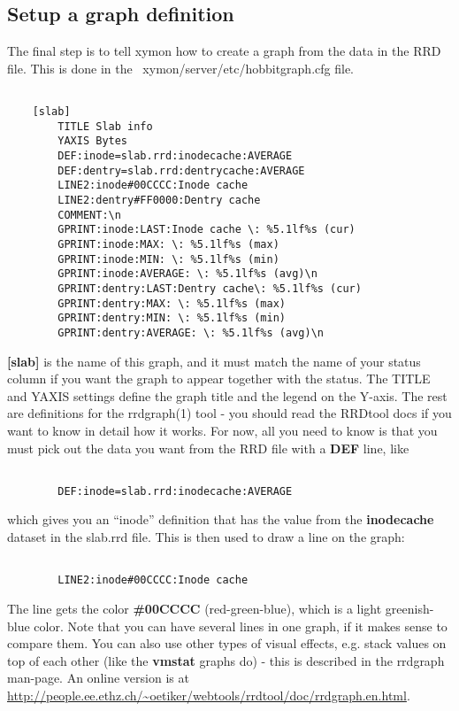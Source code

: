 \subsection{Setup a graph definition}


 The final step is to tell xymon how to create a graph from the data in the RRD file. This is done in the ~xymon/server/etc/hobbitgraph.cfg file. \begin{verbatim}

	[slab]
		TITLE Slab info
		YAXIS Bytes
		DEF:inode=slab.rrd:inodecache:AVERAGE
		DEF:dentry=slab.rrd:dentrycache:AVERAGE
		LINE2:inode#00CCCC:Inode cache
		LINE2:dentry#FF0000:Dentry cache
		COMMENT:\n
		GPRINT:inode:LAST:Inode cache \: %5.1lf%s (cur)
		GPRINT:inode:MAX: \: %5.1lf%s (max)
		GPRINT:inode:MIN: \: %5.1lf%s (min)
		GPRINT:inode:AVERAGE: \: %5.1lf%s (avg)\n
		GPRINT:dentry:LAST:Dentry cache\: %5.1lf%s (cur)
		GPRINT:dentry:MAX: \: %5.1lf%s (max)
		GPRINT:dentry:MIN: \: %5.1lf%s (min)
		GPRINT:dentry:AVERAGE: \: %5.1lf%s (avg)\n

\end{verbatim}



 \textbf{[slab]}
 is the name of this graph, and it must match the name of your status column if you want the graph to appear together with the status. The TITLE and YAXIS settings define the graph title and the legend on the Y-axis. The rest are definitions for the rrdgraph(1) tool - you should read the RRDtool docs if you want to know in detail how it works. For now, all you need to know is that you must pick out the data you want from the RRD file with a \textbf{DEF}
 line, like \begin{verbatim}

		DEF:inode=slab.rrd:inodecache:AVERAGE

\end{verbatim}
 which gives you an ``inode'' definition that has the value from the \textbf{inodecache}
 dataset in the slab.rrd file. This is then used to draw a line on the graph: \begin{verbatim}

		LINE2:inode#00CCCC:Inode cache

\end{verbatim}
 The line gets the color \textbf{\#00CCCC}
 (red-green-blue), which is a light greenish-blue color. Note that you can have several lines in one graph, if it makes sense to compare them. You can also use other types of visual effects, e.g. stack values on top of each other (like the \textbf{vmstat}
 graphs do) - this is described in the rrdgraph man-page. An online version is at  \url{http://people.ee.ethz.ch/~oetiker/webtools/rrdtool/doc/rrdgraph.en.html}.


